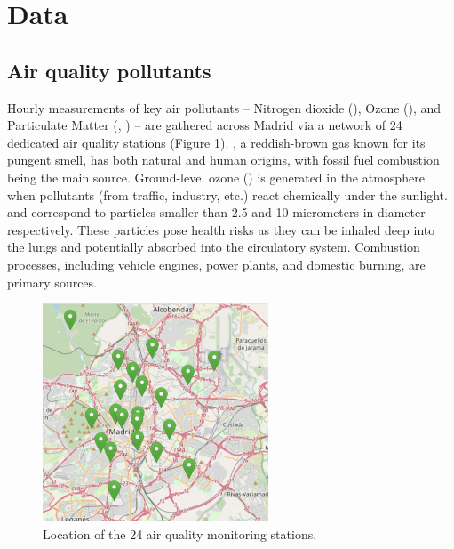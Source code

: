 \documentclass[12pt,a4paper]{book}
\begin{document}
\section{Data}
\label{data:sources}
\subsection{Air quality pollutants}
Hourly measurements of key air pollutants – Nitrogen dioxide (\no), Ozone (\ot), and Particulate Matter (\pmtwo, \pmten) – are gathered across Madrid via a network of 24 dedicated air quality stations (Figure \ref{figure:stationmap}). \no{}, a reddish-brown gas known for its pungent smell, has both natural and human origins, with fossil fuel combustion being the main source. Ground-level ozone (\ot) is generated in the atmosphere when pollutants (from traffic, industry, etc.) react chemically under the sunlight. \pmtwo{} and \pmten{} correspond to particles smaller than 2.5 and 10 micrometers in diameter respectively. These particles pose health risks as they can be inhaled deep into the lungs and potentially absorbed into the circulatory system. Combustion processes, including vehicle engines, power plants, and domestic burning, are primary sources.

\begin{figure}
  \centering
  \includegraphics[width=0.6\textwidth]{stations}
  \caption{\label{figure:stationmap}Location of the 24 air quality monitoring stations.}
\end{figure}
\end{document}
